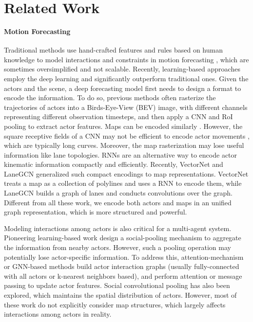 


\section{Related Work}

\paragraph{Motion Forecasting}
Traditional methods use hand-crafted features and rules based on human knowledge 
to model interactions and constraints in motion forecasting
\cite{choi2013understanding,choi2012unified,helbing1995social,mehran2009abnormal,yamaguchi2011you,weichiuplay}, which are sometimes oversimplified and not scalable. 
Recently, learning-based approaches employ the deep learning and
significantly outperform traditional ones.
Given the actors and the scene, a deep
forecasting model first needs to design a format to encode the information.
To do so, previous methods \cite{precog,chauffeurnet,covernet} often rasterize
the trajectories of
actors into a Birds-Eye-View (BEV) image, with different channels representing
different observation timesteps, and then apply a CNN and RoI pooling
\cite{fasterrcnn,maskrcnn} to extract actor features. 
Maps can be encoded similarly
\cite{nmp,dsd,intentnet,chauffeurnet,mfp}. 
However, the square receptive fields of a CNN may not be efficient to
encode actor movements \cite{lgn}, which are typically long curves.
Moreover, the map rasterization may lose useful information like lane topologies. 
RNNs are an alternative way to encode actor kinematic information
\cite{matf,mfp,vectornet,tnt,socialgan,sociallstm} compactly and efficiently.
Recently, VectorNet \cite{vectornet} and LaneGCN \cite{lgn} generalized such compact encodings to map representations. 
VectorNet treats a map
as a collection of polylines and uses a RNN to encode them, while LaneGCN builds a
graph of lanes and conducts convolutions over the graph. Different from all these
work, we encode both actors and maps in an unified graph representation, which
is more structured and powerful.


Modeling interactions among actors is also critical for
a multi-agent system. Pioneering learning-based work design a social-pooling mechanism
\cite{sociallstm,socialgan} to aggregate the information from nearby actors.
However, such a 
pooling operation may potentially lose
actor-specific information. To address this,
attention-mechanism \cite{sophie,socialatt,carnet,sun2019relational} or GNN-based
methods \cite{dsd,interacttransformer,lgn,spagnn,precog,mfp,ilvm,vectornet} build actor
interaction graphs (usually fully-connected with all actors or k-nearest
neighbors based),
and perform attention or message passing to update actor features.
Social convolutional pooling \cite{matf,socialconvpool,pip} has also been explored, which maintains the spatial
distribution of actors. 
However, most of these work do not explicitly consider map structures,
which largely affects interactions among actors in reality. 


